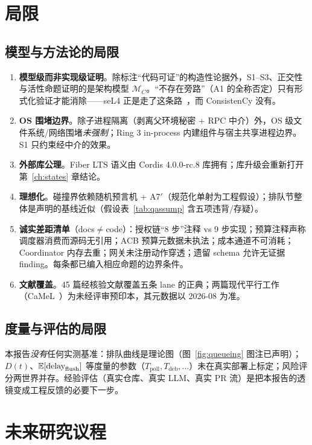 \chapter{局限}\label{ch:limits}

\section{模型与方法论的局限}
\begin{enumerate}[itemsep=0.1em]
  \item \textbf{模型级而非实现级证明}。除标注“代码可证”的构造性论据外，S1--S3、正交性与活性命题证明的是架构模型 $\mathcal{M}_C$。“不存在旁路”（A1 的全称否定）只有形式化验证才能消除——seL4 正是走了这条路~\cite{klein2009}，而 ConsistenCy 没有。
  \item \textbf{OS 围堵边界}。除子进程隔离（剥离父环境秘密 + RPC 中介）外，OS 级文件系统/网络围堵\emph{未强制}；Ring 3 in-process 内建组件与宿主共享进程边界。S1 只约束经中介的效果。
  \item \textbf{外部库公理}。Fiber LTS 语义由 Cordis 4.0.0-rc.8 库拥有；库升级会重新打开第~\ref{ch:states} 章结论。
  \item \textbf{理想化}。碰撞界依赖随机预言机 + A7$'$（规范化单射为工程假设）；排队节整体是声明的基线近似（假设表~\ref{tab:qassump} 含五项违背/存疑）。
  \item \textbf{诚实差距清单}（docs$\neq$code）：授权链“8 步”注释 vs 9 步实现；预算注释声称调度器消费而源码无引用；ACB 预算元数据未执法；成本通道不可消耗；Coordinator 内存去重；网关未注册动作穿透；遗留 schema 允许无证据 finding。每条都已编入相应命题的边界条件。
  \item \textbf{文献覆盖}。45 篇经核验文献覆盖五条 lane 的正典；两篇现代平行工作（CaMeL~\cite{debenedetti2025}）为未经评审预印本，其元数据以 2026-08 为准。
\end{enumerate}

\section{度量与评估的局限}
本报告\emph{没有}任何实测基准：排队曲线是理论图（图~\ref{fig:queueing} 图注已声明）；$D(t)$、$\operatorname{\mathbb{E}}[\text{delay}_{\mathrm{flush}}]$ 等度量的参数（$T_{\mathrm{poll}},T_{\mathrm{deb}},\dots$）未在真实部署上标定；风险评分两世界并存。经验评估（真实仓库、真实 LLM、真实 PR 流）是把本报告的透镜变成工程反馈的必要下一步。

\chapter{未来研究议程}\label{ch:future}

